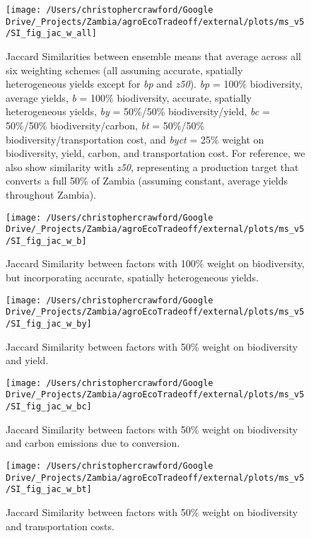 \documentclass[
]{article}
\begin{document}
\begin{figure}
\texttt{[image: /Users/christophercrawford/Google Drive/\_Projects/Zambia/agroEcoTradeoff/external/plots/ms\_v5/SI\_fig\_jac\_w\_all]} \caption{Jaccard Similarities between ensemble means that average across all six weighting schemes (all assuming accurate, spatially heterogeneous yields except for \emph{bp} and \emph{z50}). \emph{bp} = 100\% biodiversity, average yields, \emph{b} = 100\% biodiversity, accurate, spatially heterogeneous yields, \emph{by} = 50\%/50\% biodiversity/yield, \emph{bc} = 50\%/50\% biodiversity/carbon, \emph{bt} = 50\%/50\% biodiversity/transportation cost, and \emph{byct} = 25\% weight on biodiversity, yield, carbon, and transportation cost. For reference, we also show similarity with \emph{z50}, representing a production target that converts a full 50\% of Zambia (assuming constant, average yields throughout Zambia).}\label{fig:jac-w-all}
\end{figure}

\begin{figure}
\texttt{[image: /Users/christophercrawford/Google Drive/\_Projects/Zambia/agroEcoTradeoff/external/plots/ms\_v5/SI\_fig\_jac\_w\_b]} \caption{Jaccard Similarity between factors with 100\% weight on biodiversity, but incorporating accurate, spatially heterogeneous yields.}\label{fig:jac-w-b}
\end{figure}

\begin{figure}
\texttt{[image: /Users/christophercrawford/Google Drive/\_Projects/Zambia/agroEcoTradeoff/external/plots/ms\_v5/SI\_fig\_jac\_w\_by]} \caption{Jaccard Similarity between factors with 50\% weight on biodiversity and yield.}\label{fig:jac-w-by}
\end{figure}

\begin{figure}
\texttt{[image: /Users/christophercrawford/Google Drive/\_Projects/Zambia/agroEcoTradeoff/external/plots/ms\_v5/SI\_fig\_jac\_w\_bc]} \caption{Jaccard Similarity between factors with 50\% weight on biodiversity and carbon emissions due to conversion.}\label{fig:jac-w-bc}
\end{figure}

\begin{figure}
\texttt{[image: /Users/christophercrawford/Google Drive/\_Projects/Zambia/agroEcoTradeoff/external/plots/ms\_v5/SI\_fig\_jac\_w\_bt]} \caption{Jaccard Similarity between factors with 50\% weight on biodiversity and transportation costs.}\label{fig:jac-w-bt}
\end{figure}
\end{document}
